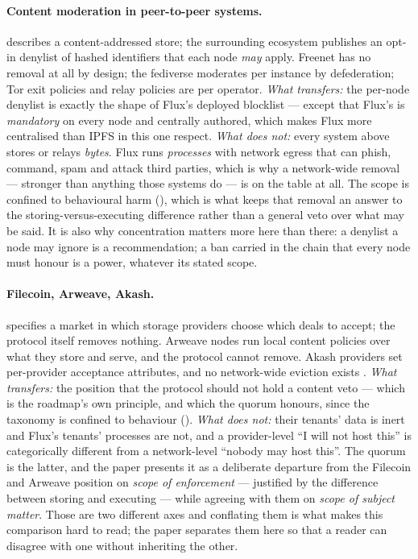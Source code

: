 \paragraph{Content moderation in peer-to-peer systems.} \citet{benet2014ipfs} describes a
content-addressed store; the surrounding ecosystem publishes an opt-in denylist of hashed
identifiers that each node \emph{may} apply. Freenet has no removal at all by design; the fediverse
moderates per instance by defederation; Tor exit policies and relay policies are per operator.
\emph{What transfers:} the per-node denylist is exactly the shape of Flux's deployed blocklist —
except that Flux's is \emph{mandatory} on every node and centrally authored, which makes Flux more
centralised than IPFS in this one respect. \emph{What does not:} every system above stores or relays
\emph{bytes}. Flux runs \emph{processes} with network egress that can phish, command, spam and
attack third parties, which is why a network-wide removal — stronger than anything those systems do
— is on the table at all. The scope is confined to behavioural harm
(), which is what keeps that removal an answer to the storing-versus-executing
difference rather than a general veto over what may be said. It is also why concentration matters
more here than there: a denylist a node may ignore is a recommendation; a ban carried in the chain
that every node must honour is a power, whatever its stated scope.

\paragraph{Filecoin, Arweave, Akash.} \citet{filecoin2017} specifies a market in which storage
providers choose which deals to accept; the protocol itself removes nothing. Arweave nodes run local
content policies over what they store and serve, and the protocol cannot remove. Akash providers set
per-provider acceptance attributes, and no network-wide eviction exists \citep{akash}. \emph{What
transfers:} the position that the protocol should not hold a content veto — which is the roadmap's
own principle, and which the quorum honours, since the taxonomy is confined to behaviour
().
\emph{What does not:} their tenants' data is inert and Flux's tenants' processes are not, and a
provider-level ``I will not host this'' is categorically different from a network-level ``nobody may
host this''. The quorum is the latter, and the paper presents it as a deliberate departure from the
Filecoin and Arweave position on \emph{scope of enforcement} --- justified by the difference between
storing and executing --- while agreeing with them on \emph{scope of subject matter}. Those are two
different axes and conflating them is what makes this comparison hard to read; the paper separates
them here so that a reader can disagree with one without inheriting the other.

